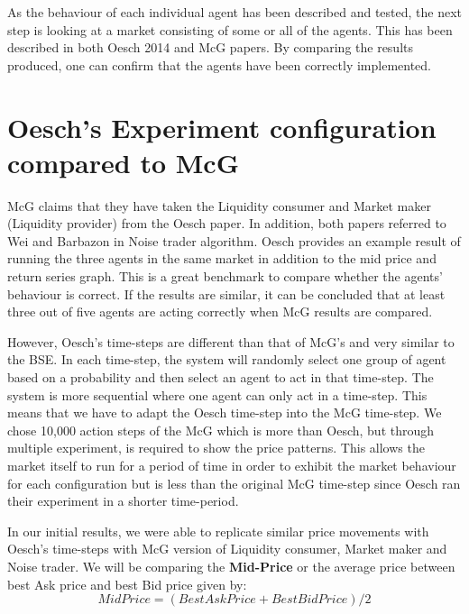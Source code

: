 As the behaviour of each individual agent has been described and tested, the next step is looking at a market consisting of some or all of the agents. This has been described in both Oesch 2014 \cite{Oesch} and McG \cite{McGroarty} papers. By comparing the results produced, one can confirm that the agents have been correctly implemented. 


\section{Oesch's Experiment configuration compared to McG}
McG claims that they have taken the Liquidity consumer and Market maker (Liquidity provider) from the Oesch paper. In addition, both papers referred to Wei and Barbazon \cite{CuiNoise} in Noise trader algorithm. Oesch provides an example result of running the three agents in the same market in addition to the mid price and return series graph. This is a great benchmark to compare whether the agents' behaviour is correct. If the results are similar, it can be concluded that at least three out of five agents are acting correctly when McG results are compared. 

However, Oesch's time-steps are different than that of McG's and very similar to the BSE. In each time-step, the system will randomly select one group of agent based on a probability and then select an agent to act in that time-step. The system is more sequential where one agent can only act in a time-step. This means that we have to adapt the Oesch time-step into the McG time-step. We chose 10,000 action steps of the McG which is more than Oesch, but through multiple experiment, is required to show the price patterns. This allows the market itself to run for a period of time in order to exhibit the market behaviour for each configuration but is less than the original McG time-step since Oesch ran their experiment in a shorter time-period.

In our initial results, we were able to replicate similar price movements with Oesch's time-steps with McG version of Liquidity consumer, Market maker and Noise trader. We will be comparing the \textbf{Mid-Price} or the average price between best Ask price and best Bid price given by: 
\begin{equation}
    Mid Price = (BestAskPrice + BestBidPrice) / 2
\end{equation}

